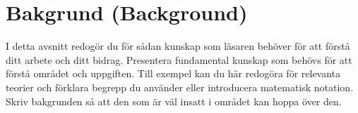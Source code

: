 \section{Bakgrund (Background)}
\label{sec:background}

I detta avsnitt redogör du för sådan kunskap som läsaren behöver för att förstå ditt arbete och ditt bidrag. Presentera fundamental kunskap som behövs för att förstå området och uppgiften. Till exempel kan du här redogöra för relevanta teorier och förklara begrepp du använder eller introducera matematisk notation. Skriv bakgrunden så att den som är väl insatt i området kan hoppa över den. 

